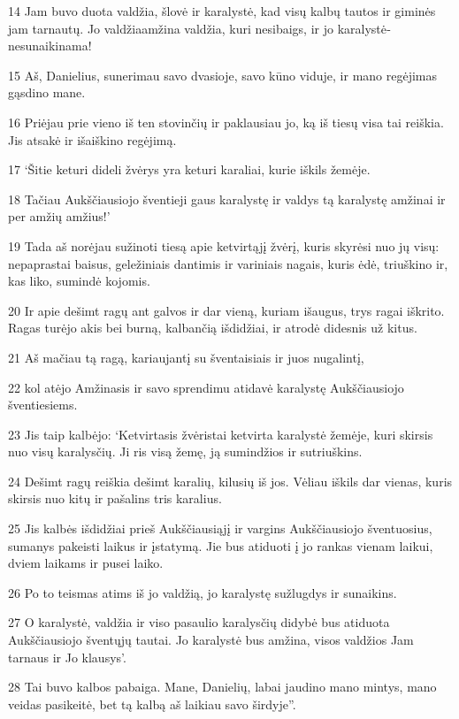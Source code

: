 \par 14 Jam buvo duota valdžia, šlovė ir karalystė, kad visų kalbų tautos ir giminės jam tarnautų. Jo valdžia­amžina valdžia, kuri nesibaigs, ir jo karalystė­nesunaikinama! 
\par 15 Aš, Danielius, sunerimau savo dvasioje, savo kūno viduje, ir mano regėjimas gąsdino mane. 
\par 16 Priėjau prie vieno iš ten stovinčių ir paklausiau jo, ką iš tiesų visa tai reiškia. Jis atsakė ir išaiškino regėjimą. 
\par 17 ‘Šitie keturi dideli žvėrys yra keturi karaliai, kurie iškils žemėje. 
\par 18 Tačiau Aukščiausiojo šventieji gaus karalystę ir valdys tą karalystę amžinai ir per amžių amžius!’ 
\par 19 Tada aš norėjau sužinoti tiesą apie ketvirtąjį žvėrį, kuris skyrėsi nuo jų visų: nepaprastai baisus, geležiniais dantimis ir variniais nagais, kuris ėdė, triuškino ir, kas liko, sumindė kojomis. 
\par 20 Ir apie dešimt ragų ant galvos ir dar vieną, kuriam išaugus, trys ragai iškrito. Ragas turėjo akis bei burną, kalbančią išdidžiai, ir atrodė didesnis už kitus. 
\par 21 Aš mačiau tą ragą, kariaujantį su šventaisiais ir juos nugalintį, 
\par 22 kol atėjo Amžinasis ir savo sprendimu atidavė karalystę Aukščiausiojo šventiesiems. 
\par 23 Jis taip kalbėjo: ‘Ketvirtasis žvėris­tai ketvirta karalystė žemėje, kuri skirsis nuo visų karalysčių. Ji ris visą žemę, ją sumindžios ir sutriuškins. 
\par 24 Dešimt ragų reiškia dešimt karalių, kilusių iš jos. Vėliau iškils dar vienas, kuris skirsis nuo kitų ir pašalins tris karalius. 
\par 25 Jis kalbės išdidžiai prieš Aukščiausiąjį ir vargins Aukščiausiojo šventuosius, sumanys pakeisti laikus ir įstatymą. Jie bus atiduoti į jo rankas vienam laikui, dviem laikams ir pusei laiko. 
\par 26 Po to teismas atims iš jo valdžią, jo karalystę sužlugdys ir sunaikins. 
\par 27 O karalystė, valdžia ir viso pasaulio karalysčių didybė bus atiduota Aukščiausiojo šventųjų tautai. Jo karalystė bus amžina, visos valdžios Jam tarnaus ir Jo klausys’. 
\par 28 Tai buvo kalbos pabaiga. Mane, Danielių, labai jaudino mano mintys, mano veidas pasikeitė, bet tą kalbą aš laikiau savo širdyje”.



